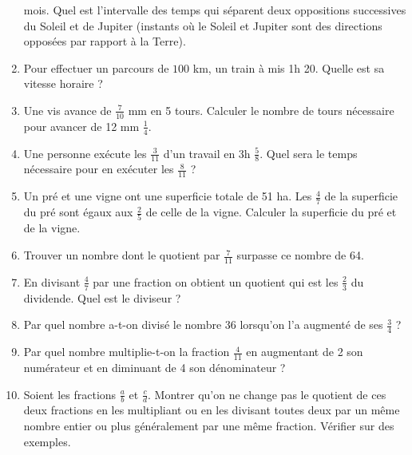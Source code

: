 \begin{enumerate}
 mois. Quel est l'intervalle des temps qui séparent deux oppositions successives du Soleil et de Jupiter (instants où le Soleil et Jupiter sont des directions opposées par rapport à la Terre). 
 \item Pour effectuer un parcours de $100$ km, un train à mis 1h 20. Quelle
 est sa vitesse horaire ? 
 \item Une vis avance de $\frac7{10}$ mm en 5 tours. Calculer le nombre de
 tours nécessaire pour avancer de 12 mm $\frac14$. 
 \item Une personne exécute les $\frac{3}{11}$ d'un travail en 3h $\frac58$.
 Quel sera le temps nécessaire pour en exécuter les $\frac8{11}$ ? 
 \item Un pré et une vigne ont une superficie totale de 51 ha. Les $\frac47$ de
 la superficie du pré sont égaux aux $\frac25$ de celle de la vigne. Calculer 
 la superficie du pré et de la vigne. 
 \item Trouver un nombre dont le quotient par $\frac7{11}$ surpasse ce nombre
 de 64. 
 \item En divisant $\frac47$ par une fraction on obtient un quotient qui est
 les $\frac23$ du dividende. Quel est le diviseur ? 
 \item Par quel nombre a-t-on divisé le nombre 36 lorsqu'on l'a augmenté de ses $\frac34$ ?
 \item Par quel nombre multiplie-t-on la fraction $\frac4{11}$ en augmentant
 de 2 son numérateur et en diminuant de 4 son dénominateur ? 
 \item Soient les fractions $\frac{a}b$ et $\frac{c}d$. Montrer qu'on ne change pas le quotient de ces deux fractions en les multipliant ou en les divisant toutes deux par un même nombre entier ou plus généralement par une même fraction. Vérifier sur des exemples. 
 
 \end{enumerate}
 